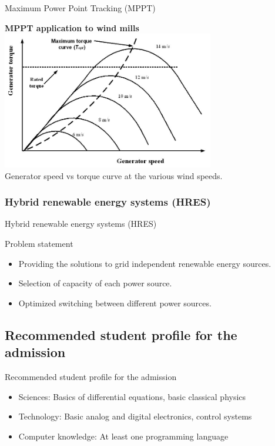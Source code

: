 \documentclass{beamer}
\begin{document}
\begin{frame}[allowframebreaks]{Maximum Power Point Tracking (MPPT)}
\begin{center}
		\textbf{MPPT application to wind mills}\\
		\includegraphics[height=6cm]{images/mppt-wind}\\
		Generator speed vs torque curve at the various wind speeds.%
	\end{center}
	\framebreak
\end{frame}
\subsubsection{Hybrid renewable energy systems (HRES)}
\begin{frame}[allowframebreaks]{Hybrid renewable energy systems (HRES)}
	\begin{block}{Problem statement}
		\begin{itemize}
			\item Providing the solutions to grid independent renewable energy sources.
			\item Selection of capacity of each power source.
			\item Optimized switching between different power sources.
		\end{itemize}
	\end{block}
	\framebreak
\end{frame}
\subsection{Recommended student profile for the admission}
\begin{frame}{Recommended student profile for the admission}
\begin{itemize}
	\item Sciences: Basics of differential equations, basic classical physics
	\item Technology: Basic analog and digital electronics, control systems
	\item Computer knowledge: At least one programming language
\end{itemize}
\end{frame}
\end{document}
